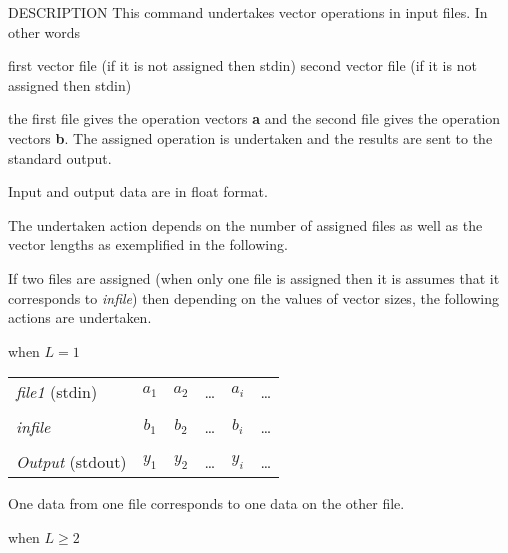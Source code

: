 \begin{synopsis}
\item[vopr] [ --l $L$ ] [ --n $N$ ] [ --i ] [ --a ] [ --s ] [ --m ] [ --d ] 
\item[\ ~~~~] [ --ATAN2 ][ {\em file1} ] [ {\em infile} ]
\end{synopsis}

\begin{qsection}{DESCRIPTION}
This command undertakes vector operations in input files.
In other words
\begin{description}
first vector file (if it is not assigned then stdin)
second vector file (if it is not assigned then stdin)
\end{description}
the first file gives the operation vectors {\bf a}
and the second file gives the operation vectors {\bf b}.
The assigned operation is undertaken and the results
are sent to the standard output.
\par
Input and output data are in float format.
\par
The undertaken action depends on the number of assigned files
as well as the vector lengths as exemplified in the following.
\par
If two files are assigned (when only one file is assigned
then it is assumes that it corresponds to {\em infile}) then
depending on the values of vector sizes, the following actions
are undertaken.
\begin{description}
\item{when $L=1$}~\\
\begin{tabular}{l|c|c|c|c|c} \cline{2-6}
{\em file1} (stdin)     & {$a_1$} & {$a_2$} & {\dots}
                        & {$a_i$} & {\dots} \\ \cline{2-6}
\multicolumn{6}{c}{}    \\[-10pt] \cline{2-6}
{\em infile}            & {$b_1$} & {$b_2$} & {\dots}
                        & {$b_i$} & {\dots} \\ \cline{2-6}
\multicolumn{6}{c}{}    \\[-10pt] \cline{2-6}
{\em Output} (stdout)   & {$y_1$} & {$y_2$} & {\dots}
                        & {$y_i$} & {\dots} \\ \cline{2-6}
\end{tabular}
\par
One data from one file corresponds to one data on the other file.
\item{when $L\geq 2$}~\\

\end{description}
\end{qsection}
